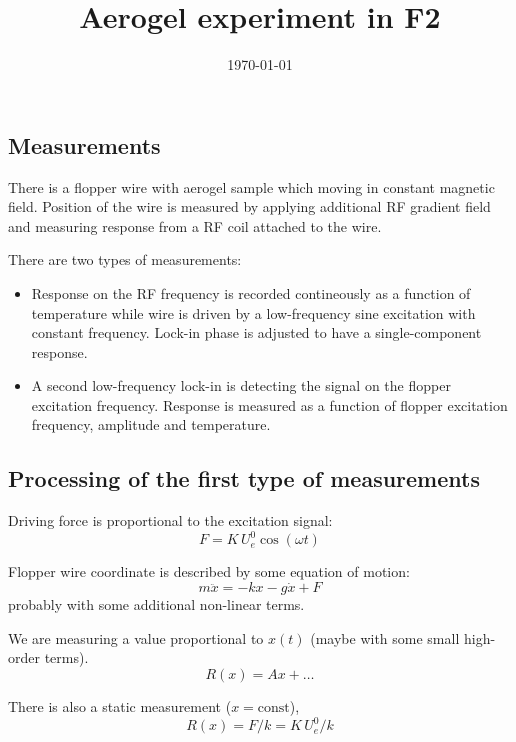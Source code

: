 \documentclass{article}
\begin{document}
\title{Aerogel experiment in F2}

\author{}

\date{\today}
\maketitle

\subsection*{Measurements}

There is a flopper wire with aerogel sample which moving in constant magnetic field.
Position of the wire is measured by applying additional RF gradient field and measuring
response from a RF coil attached to the wire.

There are two types of measurements:

\begin{itemize}

\item  Response on the RF frequency is recorded
contineously as a function of temperature while wire is driven by a
low-frequency sine excitation with constant frequency. Lock-in phase is
adjusted to have a single-component response.

\item  A second low-frequency lock-in is detecting the signal on the
flopper excitation frequency. Response is measured as a function of
flopper excitation frequency, amplitude and temperature.

\end{itemize}

\subsection*{Processing of the first type of measurements}


Driving force is proportional to the excitation signal:
$$
F = K\,U_e^0 \cos(\omega t)
$$

Flopper wire coordinate is described by some equation of motion:
$$
m \ddot x = -k x - g \dot x + F
$$
probably with some additional non-linear terms.

We are measuring a value proportional to $x(t)$ (maybe with
some small high-order terms).
$$
R(x) = Ax + \ldots
$$

There is also a static measurement ($x=\mbox{const}$),
$$
R(x) = F/k  =  K\,U_e^0 / k
$$
\end{document}
